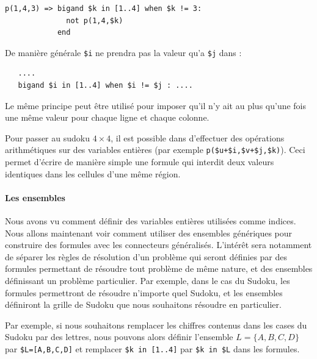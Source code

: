 \begin{lstlisting}
p(1,4,3) => bigand $k in [1..4] when $k != 3:
              not p(1,4,$k)
            end
\end{lstlisting}

\noindent De manière générale \texttt{\$i} ne prendra pas la valeur qu'a \texttt{\$j} dans : 
\begin{lstlisting}
   ....
   bigand $i in [1..4] when $i != $j : ....
\end{lstlisting}

Le même principe peut être utilisé pour imposer qu'il n'y ait au plus qu'une fois une même valeur pour chaque ligne et chaque colonne.

Pour passer au sudoku $4\times 4$, il est possible dans \touist d'effectuer des opérations arithmétiques sur des variables entières (par exemple \texttt{p(\$u+\$i,\$v+\$j,\$k)}). Ceci permet d'écrire de manière simple une formule qui interdit deux valeurs identiques dans les cellules d'une même région.
    

\paragraph{Les ensembles}

Nous avons vu comment définir des variables entières utilisées comme indices.
Nous allons maintenant voir comment utiliser des ensembles génériques pour construire des formules avec les connecteurs généralisés. L'intérêt sera notamment de séparer les règles de résolution d'un problème qui seront définies par des formules permettant de résoudre tout problème de même nature, et des ensembles définissant un problème particulier. Par exemple, dans le cas du Sudoku, les formules permettront de résoudre n'importe quel Sudoku, et les ensembles définiront la grille de Sudoku que nous souhaitons résoudre en particulier.

Par exemple, si nous souhaitons remplacer les chiffres contenus dans les cases du Sudoku par des lettres, nous pouvons alors définir l'ensemble $L=\{A,B,C,D\}$ par \texttt{\$L=[A,B,C,D]} et remplacer \texttt{\$k in [1..4]} par \texttt{\$k in \$L} dans les formules.\\


